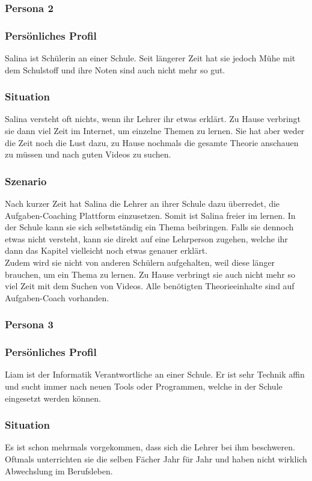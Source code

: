 \subsubsection{Persona 2}
\subsubsection*{Persönliches Profil}
Salina ist Schülerin an einer Schule. Seit längerer Zeit hat sie jedoch Mühe mit dem Schulstoff und ihre Noten sind auch nicht mehr so gut.

\subsubsection*{Situation}
Salina versteht oft nichts, wenn ihr Lehrer ihr etwas erklärt. Zu Hause verbringt sie dann viel Zeit im Internet, um einzelne Themen zu lernen. Sie hat aber weder die Zeit noch die Lust dazu, zu Hause nochmals die gesamte Theorie anschauen zu müssen und nach guten Videos zu suchen.

\subsubsection*{Szenario}
Nach kurzer Zeit hat Salina die Lehrer an ihrer Schule dazu überredet, die Aufgaben-Coaching Plattform einzusetzen. Somit ist Salina freier im lernen. In der Schule kann sie sich selbstständig ein Thema beibringen. Falls sie dennoch etwas nicht versteht, kann sie direkt auf eine Lehrperson zugehen, welche ihr dann das Kapitel vielleicht noch etwas genauer erklärt. \\
Zudem wird sie nicht von anderen Schülern aufgehalten, weil diese länger brauchen, um ein Thema zu lernen. Zu Hause verbringt sie auch nicht mehr so viel Zeit mit dem Suchen von Videos. Alle benötigten Theorieeinhalte sind auf Aufgaben-Coach vorhanden.

\subsubsection{Persona 3}
\subsubsection*{Persönliches Profil}
Liam ist der Informatik Verantwortliche an einer Schule. Er ist sehr Technik affin und sucht immer nach neuen Tools oder Programmen, welche in der Schule eingesetzt werden können.

\subsubsection*{Situation}
Es ist schon mehrmals vorgekommen, dass sich die Lehrer bei ihm beschweren. Oftmals unterrichten sie die selben Fächer Jahr für Jahr und haben nicht wirklich Abwechslung im Berufsleben. 

